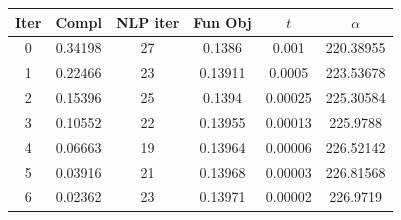 \begin{tabular}{c c c c c c}
\toprule
Iter & Compl & NLP iter & Fun Obj & $t$ & $\alpha$ \\
\midrule
0 & 0.34198 & 27 & 0.1386 & 0.001 & 220.38955 \\
1 & 0.22466 & 23 & 0.13911 & 0.0005 & 223.53678 \\
2 & 0.15396 & 25 & 0.1394 & 0.00025 & 225.30584 \\
3 & 0.10552 & 22 & 0.13955 & 0.00013 & 225.9788 \\
4 & 0.06663 & 19 & 0.13964 & 0.00006 & 226.52142 \\
5 & 0.03916 & 21 & 0.13968 & 0.00003 & 226.81568 \\
6 & 0.02362 & 23 & 0.13971 & 0.00002 & 226.9719 \\
\bottomrule
\end{tabular}